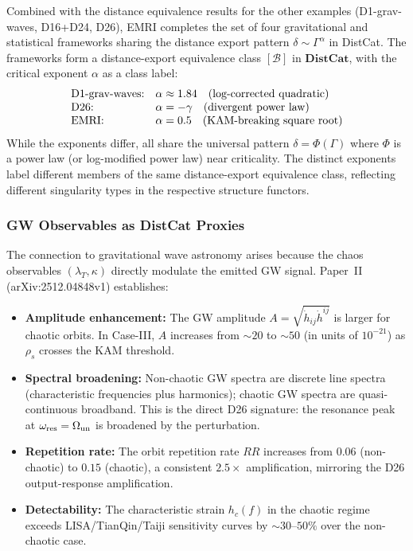 \begin{corollary}\label{cor:cross-framework-emri}
Combined with the distance equivalence results for the other examples (D1-grav-waves, D16+D24, D26), EMRI completes the set of four gravitational and statistical frameworks sharing the distance export pattern $\delta \sim \Gamma^\alpha$ in DistCat. The frameworks form a distance-export equivalence class $[\mathcal{B}]$ in $\mathbf{DistCat}$, with the critical exponent $\alpha$ as a class label:
\begin{equation}
\begin{array}{l@{\quad}l}
\text{D1-grav-waves:} & \alpha \approx 1.84 \quad (\text{log-corrected quadratic}) \\
\text{D26:} & \alpha = -\gamma \quad (\text{divergent power law}) \\
\text{EMRI:} & \alpha = 0.5 \quad (\text{KAM-breaking square root})
\end{array}
\end{equation}
While the exponents differ, all share the universal pattern $\delta = \Phi(\Gamma)$ where $\Phi$ is a power law (or log-modified power law) near criticality. The distinct exponents label different members of the same distance-export equivalence class, reflecting different singularity types in the respective structure functors.
\end{corollary}

\subsubsection{GW Observables as DistCat Proxies}\label{subsec:gw-observables}

The connection to gravitational wave astronomy arises because the chaos observables $(\lambda_T, \kappa)$ directly modulate the emitted GW signal. Paper~II (arXiv:2512.04848v1) establishes:

\begin{itemize}
\item \textbf{Amplitude enhancement:} The GW amplitude $A = \sqrt{\dot{h}_{ij}\dot{h}^{ij}}$ is larger for chaotic orbits. In Case-III, $A$ increases from $\sim 20$ to $\sim 50$ (in units of $10^{-21}$) as $\rho_s$ crosses the KAM threshold.
\item \textbf{Spectral broadening:} Non-chaotic GW spectra are discrete line spectra (characteristic frequencies plus harmonics); chaotic GW spectra are quasi-continuous broadband. This is the direct D26 signature: the resonance peak at $\omega_{\rm res} = \Omega_{\rm un}$ is broadened by the perturbation.
\item \textbf{Repetition rate:} The orbit repetition rate $RR$ increases from $0.06$ (non-chaotic) to $0.15$ (chaotic), a consistent $2.5\times$ amplification, mirroring the D26 output-response amplification.
\item \textbf{Detectability:} The characteristic strain $h_c(f)$ in the chaotic regime exceeds LISA/TianQin/Taiji sensitivity curves by $\sim 30$--$50\%$ over the non-chaotic case.
\end{itemize}

